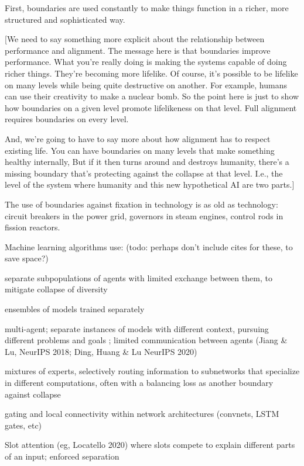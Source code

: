 First, boundaries are used constantly to make things function in a richer, more structured and sophisticated way.

[We need to say something more explicit about the relationship between performance and alignment. The message here is that boundaries improve performance. What you're really doing is making the systems capable of doing richer things. They're becoming more lifelike. Of course, it's possible to be lifelike on many levels while being quite destructive on another. For example, humans can use their creativity to make a nuclear bomb. So the point here is just to show how boundaries on a given level promote lifelikeness on that level. Full alignment requires boundaries on every level.

And, we're going to have to say more about how alignment has to respect existing life. You can have boundaries on many levels that make something healthy internally, But if it then turns around and destroys humanity, there's a missing boundary that's protecting against the collapse at that level. I.e., the level of the system where humanity and this new hypothetical AI are two parts.]

The use of boundaries against fixation in technology is as old as technology: circuit breakers in the power grid, governors in steam engines, control rods in fission reactors.

Machine learning algorithms use:  (todo: perhaps don't include cites for these, to save space?)

separate subpopulations of agents with limited exchange between them, to mitigate collapse of diversity \citep{holland1975adaptation, jaderberg2019human}

ensembles of models trained separately \citep{lakshminarayanan2017simple}

multi-agent; separate instances of models with different context, pursuing different problems and goals \citep{hammond2025multi}; limited communication between agents (Jiang \& Lu, NeurIPS 2018; Ding, Huang \& Lu NeurIPS 2020)

mixtures of experts, selectively routing information to subnetworks that specialize in different computations, often with a balancing loss as another boundary against collapse \citep{shazeer2017outrageously}

gating and local connectivity within network architectures (convnets, LSTM gates, etc)

Slot attention (eg, Locatello 2020) where slots compete to explain different parts of an input; enforced separation

